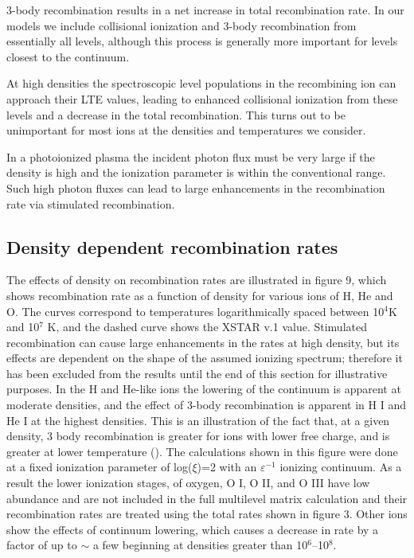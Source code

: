3-body recombination results in a net increase in  total recombination rate.
In our models we include collisional ionization and 3-body recombination 
from essentially all levels, although this process is generally more important 
for levels closest to the continuum.

At high densities the spectroscopic level populations in the recombining ion can approach
their LTE values, leading to enhanced collisional ionization from these levels and
a decrease in the total recombination.  This turns out to be 
unimportant for most ions at the densities and temperatures we consider.

In a photoionized plasma the incident photon flux must be very large if the density 
is high and the ionization parameter is within the conventional range.  Such 
high photon fluxes can lead to large enhancements in the recombination rate
via stimulated recombination.  

\subsection{Density dependent recombination rates}

The effects of density on recombination rates 
are illustrated in figure 9, which shows recombination rate as a function 
of density for various ions of H, He and O.  The curves correspond to temperatures
logarithmically spaced between 10$^4$K and 10$^7$ K, and the dashed curve shows the 
XSTAR v.1 value.  Stimulated recombination can cause large enhancements in the rates at high 
density, but its effects are dependent on the shape of the assumed ionizing spectrum; 
therefore it has been excluded from the results until the end of
this section for illustrative purposes.  In the 
H and He-like ions the lowering of the continuum is apparent at moderate densities, and 
the effect of 3-body recombination is apparent in H I and He I at the highest densities. 
This is an illustration of the fact that, at a given density, 3 body recombination is 
greater for ions with lower free charge, and is greater at lower temperature (\cite{bautista2000}).
The calculations shown in this figure were done at a fixed ionization parameter of 
log($\xi$)=2 with an $\varepsilon^{-1}$ ionizing continuum.  As a result the lower ionization 
stages, of oxygen, O I, O II, and O III have low abundance and are not included in the full 
multilevel matrix calculation and their recombination rates are treated using the total 
rates shown in figure 3.  Other ions show the effects of continuum lowering, 
which causes a decrease in rate by a factor of up to $\sim$ a few 
beginning at densities greater than 10$^6$--10$^8$. 

